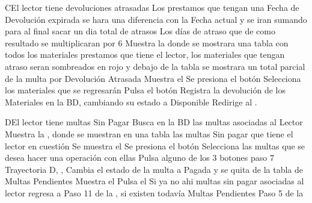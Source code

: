 		\begin{UCtrayectoriaA}{C}{El lector tiene devoluciones atrasadas}
			\UCpaso[\UCsist] Los prestamos que tengan una Fecha de Devolución expirada se hara una diferencia con la Fecha actual y se iran sumando para al final sacar un dia total de atrasos
			\UCpaso[\UCsist] Los días de atraso que de como resultado se multiplicaran por 6
			\UCpaso[\UCsist] Muestra la  donde se mostrara una tabla con todos los materiales prestamos que tiene el lector, los materiales que tengan atraso seran sombreados en rojo y debajo de la tabla se mostrara un total parcial de la multa por Devolución Atrasada
			\UCpaso[\UCsist] Muestra el 
			\UCpaso[\UCactor] Se presiona el botón 
			\UCpaso[\UCactor]	Selecciona los materiales que se regresarán
			\UCpaso[\UCactor]	Pulsa el botón 
			\UCpaso[\UCsist]	Registra la devolución de los Materiales en la BD, cambiando su estado a Disponible
			\UCpaso[\UCsist]	Redirige al .
		\end{UCtrayectoriaA}	
		\begin{UCtrayectoriaA}{D}{El lector tiene multas Sin Pagar}
			\UCpaso[\UCsist] Busca en la BD las multas asociadas al Lector
			\UCpaso[\UCsist] Muestra la , donde se muestran en una tabla las multas Sin pagar que tiene el lector en cuestión
			\UCpaso[\UCsist] Se muestra el 
			\UCpaso[\UCactor] Se presiona el botón 
			\UCpaso[\UCactor] Selecciona las multas que se desea hacer una operación con ellas
			\UCpaso[\UCactor] Pulsa alguno de los 3 botones  paso 7 Trayectoria D,  ,  
			\UCpaso[\UCsist] Cambia el estado de la multa a Pagada y se quita de la tabla de Multas Pendientes
			\UCpaso[\UCsist] Muestra el 
			\UCpaso[\UCactor] Pulsa el 
			\UCpaso[\UCsist] Si ya no ahi multas sin pagar asociadas al lector regresa a Paso 11 de la , si existen todavía Multas Pendientes Paso 5 de la 
		\end{UCtrayectoriaA}
